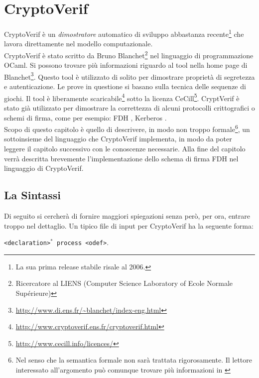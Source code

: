 \documentclass[a4paper,openright,twoside,12pt]{report}
\begin{document}
\chapter{CryptoVerif}
CryptoVerif \`e un \emph{dimostratore} automatico di sviluppo abbastanza recente\footnote{La sua prima release stabile risale al 2006.} che lavora direttamente nel modello computazionale.\\
CryptoVerif \`e stato scritto da Bruno Blanchet\footnote{Ricercatore al LIENS (Computer Science Laboratory of Ecole Normale Supérieure)} nel linguaggio di programmazione OCaml. 
Si possono trovare pi\`u informazioni riguardo al tool nella home page di Blanchet\footnote{\url{http://www.di.ens.fr/~blanchet/index-eng.html}}.
Questo tool \`e utilizzato di solito per dimostrare propriet\`a di segretezza e autenticazione. Le prove in questione  si basano sulla tecnica delle sequenze di giochi.
Il tool \`e liberamente scaricabile\footnote{\url{http://www.cryptoverif.ens.fr/cryptoverif.html}} sotto la licenza CeCill\footnote{\url{http://www.cecill.info/licences/}}.
CryptVerif \`e stato gi\`a utilizzato per dimostrare la correttezza di alcuni protocolli crittografici o schemi di firma, come per esempio: FDH \cite{BlanchetPointchevalCrypto06}, 
Kerberos \cite{BlanchetJaggardScedrovTsayAsiaCCS08}.\\
Scopo di questo capitolo \`e quello di descrivere, in modo non troppo formale\footnote{Nel senso che la semantica formale non sar\`a trattata rigorosamente. Il lettore interessato all'argomento pu\`o comunque trovare pi\`u informazioni in \cite{BlanchetJaggardScedrovTsayAsiaCCS08}}, 
un sottoinsieme del linguaggio che CryptoVerif implementa, in modo 
da poter leggere il capitolo successivo con le conoscenze necessarie.
Alla fine del capitolo verr\`a descritta brevemente l'implementazione dello schema di firma FDH nel linguaggio di CryptoVerif.
\newpage
\section{La Sintassi}
Di seguito si cercher\`a di fornire maggiori spiegazioni senza per\`o, per ora, entrare troppo nel dettaglio.
Un tipico file di input per CryptoVerif ha la seguente forma: \\
\begin{center}
\verb!<declaration>!$^{*}$\verb! process <odef>!.
\end{center}
\end{document}
